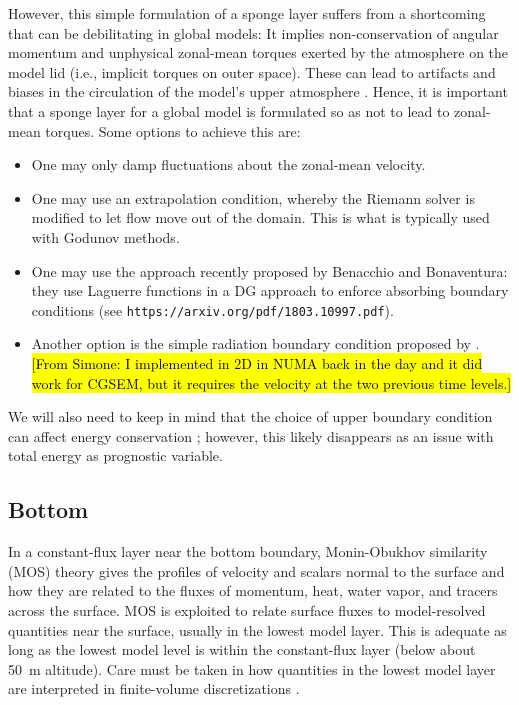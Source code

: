 \documentclass{report}
\begin{document}
However, this simple formulation of a sponge layer suffers from a shortcoming that can be debilitating in global models: It implies non-conservation of angular momentum and unphysical zonal-mean torques exerted by the atmosphere on the model lid (i.e., implicit torques on outer space). These can lead to artifacts and biases in the circulation of the model's upper atmosphere \citep[e.g.,][]{Shepherd96a}. Hence, it is important that a sponge layer for a global model is formulated so as not to lead to zonal-mean torques. Some options to achieve this are:
\begin{itemize}
    \item One may only damp fluctuations about the zonal-mean velocity.  
    \item One may use an extrapolation condition, whereby the Riemann solver is modified to let flow move out of the domain. This is what is typically used with Godunov methods. 
    \item One may use the approach recently proposed by Benacchio and Bonaventura: they use Laguerre functions in a DG approach to enforce absorbing boundary conditions (see \texttt{https://arxiv.org/pdf/1803.10997.pdf}).
    \item Another option is the simple radiation boundary condition proposed by \cite{orlanski1979}. \hl{[From Simone: I implemented in 2D in NUMA back in the day and it did work for CGSEM, but it requires the velocity at the two previous time levels.]}
\end{itemize}
    
We will also need to keep in mind that the choice of upper boundary condition can affect energy conservation \citep[e.g.,][]{Staniforth03a}; however, this likely disappears as an issue with total energy as prognostic variable.

\subsection{Bottom} 
\label{s:bottom_bc}
In a constant-flux layer near the bottom boundary, Monin-Obukhov similarity (MOS) theory gives the profiles of velocity and scalars normal to the surface and how they are related to the fluxes of momentum, heat, water vapor, and tracers across the surface. MOS is exploited to relate surface fluxes to model-resolved quantities near the surface, usually in the lowest model layer. This is adequate as long as the lowest model level is within the constant-flux layer (below about 50~m altitude). Care must be taken in how quantities in the lowest model layer are interpreted in finite-volume discretizations  \citep{Nishizawa18a}.
\end{document}
